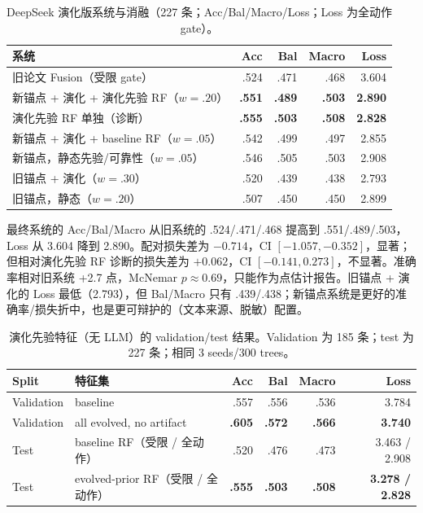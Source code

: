 \begin{table}[H]
\centering
{}
\setlength{\tabcolsep}{2.5pt}
\caption{DeepSeek 演化版系统与消融（227 条；Acc/Bal/Macro/Loss；Loss 为全动作 gate）。}
\label{tab:evolution}
\begin{tabular}{lrrrr}
\toprule
系统 & Acc & Bal & Macro & Loss \\
\midrule
旧论文 Fusion（受限 gate） & .524 & .471 & .468 & 3.604 \\
\rowcolor{yellow!18} 新锚点 + 演化 + 演化先验 RF（$w=.20$） & \textbf{.551} & \textbf{.489} & \textbf{.503} & \textbf{2.890} \\
\rowcolor{yellow!18} 演化先验 RF 单独（诊断） & \textbf{.555} & \textbf{.503} & \textbf{.508} & \textbf{2.828} \\
\rowcolor{yellow!18} 新锚点 + 演化 + baseline RF（$w=.05$） & .542 & .499 & .497 & 2.855 \\
\rowcolor{yellow!18} 新锚点，静态先验/可靠性（$w=.05$） & .546 & .505 & .503 & 2.908 \\
\rowcolor{yellow!18} 旧锚点 + 演化（$w=.30$） & .520 & .439 & .438 & 2.793 \\
\rowcolor{yellow!18} 旧锚点，静态（$w=.20$） & .507 & .450 & .450 & 2.899 \\
\bottomrule
\end{tabular}
\end{table}

\begin{revbox}
\noindent 最终系统的 Acc/Bal/Macro 从旧系统的 .524/.471/.468 提高到 .551/.489/.503，Loss 从 3.604 降到 2.890。配对损失差为 $-0.714$，CI $[-1.057,-0.352]$，显著；但相对演化先验 RF 诊断的损失差为 $+0.062$，CI $[-0.141,0.273]$，不显著。准确率相对旧系统 +2.7 点，McNemar $p\approx0.69$，只能作为点估计报告。旧锚点 + 演化的 Loss 最低（2.793），但 Bal/Macro 只有 .439/.438；新锚点系统是更好的准确率/损失折中，也是更可辩护的（文本来源、脱敏）配置。
\end{revbox}

\begin{table}[H]
\centering
{}
\setlength{\tabcolsep}{3pt}
\caption{演化先验特征（无 LLM）的 validation/test 结果。Validation 为 185 条；test 为 227 条；相同 3 seeds/300 trees。}
\label{tab:prior}
\begin{tabular}{llrrrr}
\toprule
Split & 特征集 & Acc & Bal & Macro & Loss \\
\midrule
Validation & baseline & .557 & .556 & .536 & 3.784 \\
\rowcolor{yellow!18} Validation & all evolved, no artifact & \textbf{.605} & \textbf{.572} & \textbf{.566} & \textbf{3.740} \\
Test & baseline RF（受限 / 全动作） & .520 & .476 & .473 & 3.463 / 2.908 \\
\rowcolor{yellow!18} Test & evolved-prior RF（受限 / 全动作） & \textbf{.555} & \textbf{.503} & \textbf{.508} & \textbf{3.278 / 2.828} \\
\bottomrule
\end{tabular}
\end{table}

